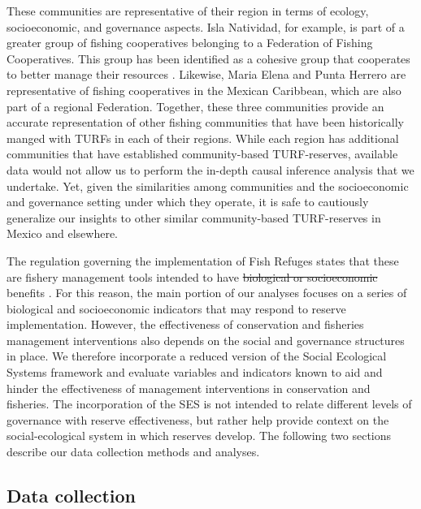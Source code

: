 \documentclass{frontiersSCNS}
\providecommand{\DIFaddtex}[1]{{\protect\color{blue}\uwave{#1}}} %
\providecommand{\DIFdeltex}[1]{{\protect\color{red}\sout{#1}}}                      %
\providecommand{\DIFaddbegin}{} %
\providecommand{\DIFaddend}{} %
\providecommand{\DIFdelbegin}{} %
\providecommand{\DIFdelend}{} %
\providecommand{\DIFadd}[1]{\texorpdfstring{\DIFaddtex{#1}}{#1}} %
\providecommand{\DIFdel}[1]{\texorpdfstring{\DIFdeltex{#1}}{}} %
\begin{document}
These communities are representative of their region in terms of ecology, socioeconomic, and governance aspects. Isla Natividad, for example, is part of a greater group of fishing cooperatives belonging to a Federation of Fishing Cooperatives. This group has been identified as a cohesive group that cooperates to better manage their resources \citep{mccay_2014,mccay_2017,acevesbueno_2017}. Likewise, Maria Elena and Punta Herrero are representative of fishing cooperatives in the Mexican Caribbean, which are also part of a regional Federation. Together, these three communities provide an accurate representation of other fishing communities that have been historically manged with TURFs in each of their regions. While each region has additional communities that have established community-based TURF-reserves, available data would not allow us to perform the in-depth causal inference analysis that we undertake. Yet, given the similarities among communities and the socioeconomic and governance setting under which they operate, it is safe to cautiously generalize our insights to other similar community-based TURF-reserves in Mexico and elsewhere.

The regulation governing the implementation of Fish Refuges states that these are fishery management tools intended to have \DIFdelbegin \DIFdel{biological or
socioeconomic }\DIFdelend \DIFaddbegin \DIFadd{conservation and fisheries }\DIFaddend benefits \citep{nom}. For this reason, the main portion of our analyses focuses on a series of biological and socioeconomic indicators that may respond to reserve implementation. However, the effectiveness of conservation and fisheries management interventions also depends on the social and governance structures in place. We therefore incorporate a reduced version of the Social Ecological Systems framework \citep{ostrom_2009} and evaluate variables and indicators known to aid and hinder the effectiveness of management interventions in conservation and fisheries. The incorporation of the SES is not intended to relate different levels of governance with reserve effectiveness, but rather help provide context on the social-ecological system in which reserves develop. The following two sections describe our data collection methods and analyses.

\hypertarget{data-collection}{%
\subsection{Data collection}\label{data-collection}}
\end{document}
